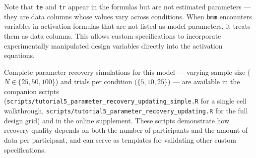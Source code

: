 \documentclass[
  man,
  floatsintext,
  longtable,
  nolmodern,
  notxfonts,
  notimes,
  colorlinks=true,linkcolor=blue,citecolor=blue,urlcolor=blue]{apa7}
\begin{document}
Note that \texttt{te} and \texttt{tr} appear in the formulas but are not
estimated parameters --- they are data columns whose values vary across
conditions. When \texttt{bmm} encounters variables in activation
formulas that are not listed as model parameters, it treats them as data
columns. This allows custom specifications to incorporate experimentally
manipulated design variables directly into the activation equations.

Complete parameter recovery simulations for this model --- varying
sample size (\(N \in \{25, 50, 100\}\)) and trials per condition
(\(\{5, 10, 25\}\)) --- are available in the companion scripts
(\texttt{scripts/tutorial5\_parameter\_recovery\_updating\_simple.R} for
a single cell walkthrough,
\texttt{scripts/tutorial5\_parameter\_recovery\_updating.R} for the full
design grid) and in the online supplement. These scripts demonstrate how
recovery quality depends on both the number of participants and the
amount of data per participant, and can serve as templates for
validating other custom specifications.
\end{document}

